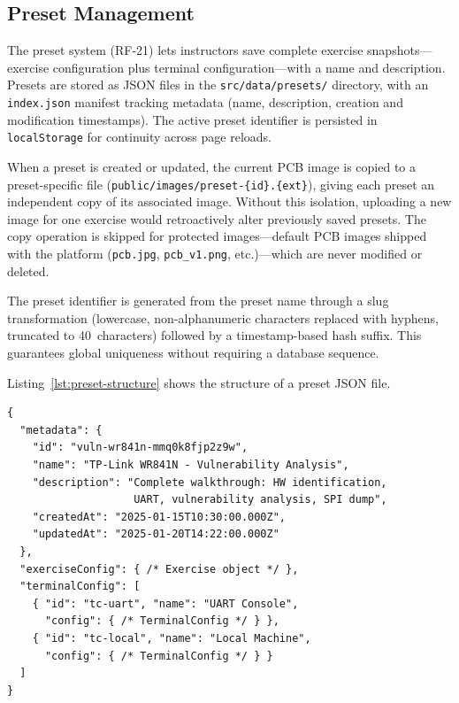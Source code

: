 \subsection{Preset Management}\label{subsec:preset-mgmt}

The preset system (RF-21) lets instructors save complete exercise snapshots---exercise configuration plus terminal configuration---with a name and description. Presets are stored as JSON files in the \texttt{src/data/presets/} directory, with an \texttt{index.json} manifest tracking metadata (name, description, creation and modification timestamps). The active preset identifier is persisted in \texttt{localStorage} for continuity across page reloads.

When a preset is created or updated, the current PCB image is copied to a preset-specific file (\texttt{public/images/preset-\{id\}.\{ext\}}), giving each preset an independent copy of its associated image. Without this isolation, uploading a new image for one exercise would retroactively alter previously saved presets. The copy operation is skipped for protected images---default PCB images shipped with the platform (\texttt{pcb.jpg}, \texttt{pcb\_v1.png}, etc.)---which are never modified or deleted.

The preset identifier is generated from the preset name through a slug transformation (lowercase, non-alphanumeric characters replaced with hyphens, truncated to 40~characters) followed by a timestamp-based hash suffix. This guarantees global uniqueness without requiring a database sequence.

Listing~\ref{lst:preset-structure} shows the structure of a preset JSON file.

\noindent\begin{minipage}{\linewidth}
\begin{lstlisting}[caption={Preset file structure bundling exercise and terminal configurations.}, label={lst:preset-structure}, language={}, basicstyle=\ttfamily\scriptsize]
{
  "metadata": {
    "id": "vuln-wr841n-mmq0k8fjp2z9w",
    "name": "TP-Link WR841N - Vulnerability Analysis",
    "description": "Complete walkthrough: HW identification,
                    UART, vulnerability analysis, SPI dump",
    "createdAt": "2025-01-15T10:30:00.000Z",
    "updatedAt": "2025-01-20T14:22:00.000Z"
  },
  "exerciseConfig": { /* Exercise object */ },
  "terminalConfig": [
    { "id": "tc-uart", "name": "UART Console",
      "config": { /* TerminalConfig */ } },
    { "id": "tc-local", "name": "Local Machine",
      "config": { /* TerminalConfig */ } }
  ]
}
\end{lstlisting}
\end{minipage}

